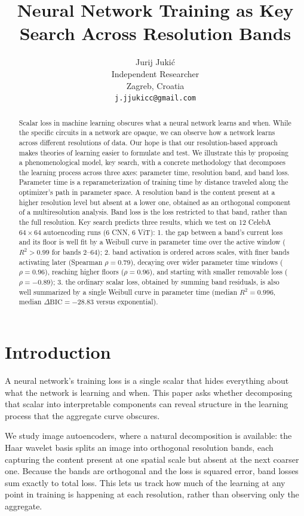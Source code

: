 \documentclass{article}
\title{Neural Network Training as Key Search Across Resolution Bands}
\author{%
  Jurij Juki\'c\\
  Independent Researcher\\
  Zagreb, Croatia\\
  \texttt{j.jjukicc@gmail.com}
}
\date{}
\begin{document}
\maketitle

\begin{abstract}
Scalar loss in machine learning obscures what a neural network learns
and when. While the specific circuits in a network are opaque, we can
observe how a network learns across different resolutions of data.
Our hope is that our resolution-based approach makes theories of
learning easier to formulate and test. We illustrate this by proposing
a phenomenological model, key search, with a concrete methodology that decomposes
the learning process across three axes: parameter time, resolution band,
and band loss. Parameter time is a reparameterization of training time
by distance traveled along the optimizer's path in parameter space. A
resolution band is the content present at a higher resolution level but
absent at a lower one, obtained as an orthogonal component of a
multiresolution analysis. Band loss is the loss restricted to that band,
rather than the full resolution. Key search predicts three results,
which we test on 12 CelebA $64\times 64$ autoencoding runs (6 CNN, 6 ViT): 1.
the gap between a band's current loss and its floor is well fit by a
Weibull curve in parameter time over the active window ($R^2 >
0.99$ for bands 2--64); 2. band activation is ordered across scales, with
finer bands activating later (Spearman $\rho = 0.79$), decaying over wider
parameter time windows ($\rho = 0.96$), reaching higher floors ($\rho = 0.96$),
and starting with smaller removable loss ($\rho = -0.89$); 3. the ordinary
scalar loss, obtained by summing band residuals, is also well
summarized by a single Weibull curve in parameter time (median
$R^2 = 0.996$, median $\Delta\mathrm{BIC} = -28.83$ versus exponential).

\end{abstract}

\section{Introduction}\label{intro}

A neural network's training loss is a single scalar that hides
everything about what the network is learning and when. This paper asks
whether decomposing that scalar into interpretable components can reveal
structure in the learning process that the aggregate curve obscures.

We study image autoencoders, where a natural decomposition is available:
the Haar wavelet basis splits an image into orthogonal resolution bands,
each capturing the content present at one spatial scale but absent at the
next coarser one. Because the bands are orthogonal and the loss is
squared error, band losses sum exactly to total loss. This lets us track
how much of the learning at any point in training is happening at each
resolution, rather than observing only the aggregate.
\end{document}

